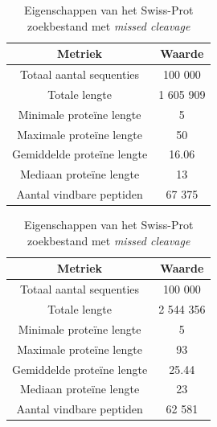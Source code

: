 \documentclass[11pt,dutch,faculty=we,layout=titlefont,underline=false,titleUppercase=true,titleUnderline=true]{ugent2016-report}
\begin{document}
    \begin{table}[!h]
        \begin{minipage}{.5\linewidth}
            \centering
            \begin{tabular}{c c}
                Metriek                    & Waarde    \\
                \hline\hline
                Totaal aantal sequenties   & 100 000   \\
                Totale lengte              & 1 605 909 \\
                Minimale proteïne lengte   & 5         \\
                Maximale proteïne lengte   & 50        \\
                Gemiddelde proteïne lengte & 16.06     \\
                Mediaan proteïne lengte    & 13        \\
                Aantal vindbare peptiden   & 67 375    \\
                \hline
            \end{tabular}
            \caption{Eigenschappen van \newline het Swiss-Prot zoekbestand \newline zonder \textit{missed cleavage}}
            \label{tab:swiss_geen_missed_cleavage}
        \end{minipage}
        \begin{minipage}{.5\linewidth}
            \centering
            \begin{tabular}{ c c }
                Metriek                    & Waarde    \\
                \hline\hline
                Totaal aantal sequenties   & 100 000   \\
                Totale lengte              & 2 544 356 \\
                Minimale proteïne lengte   & 5         \\
                Maximale proteïne lengte   & 93        \\
                Gemiddelde proteïne lengte & 25.44     \\
                Mediaan proteïne lengte    & 23        \\
                Aantal vindbare peptiden   & 62 581    \\
                \hline
            \end{tabular}
            \caption{Eigenschappen van \newline het Swiss-Prot zoekbestand \newline met \textit{missed cleavage}}
            \label{tab:swiss_missed_cleavage}
        \end{minipage}
    \end{table}
\end{document}
